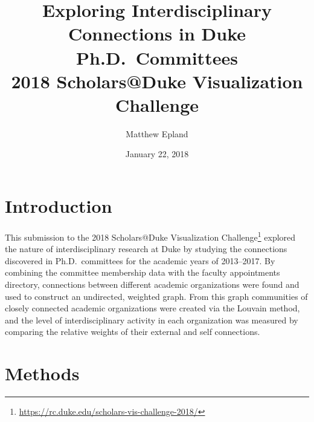 \documentclass[notitlepage,aps,prd,nofootinbib]{revtex4-1}
\begin{document}
\title{Exploring Interdisciplinary Connections in Duke Ph.D.\ Committees\\2018 Scholars@Duke Visualization Challenge}
\author{Matthew\,\,Epland}
\date{January 22, 2018}


\maketitle

\vspace{-1.2cm}

\section{Introduction}
This submission to the 2018 Scholars@Duke Visualization Challenge\footnote{\url{https://rc.duke.edu/scholars-vis-challenge-2018/}} explored the nature of interdisciplinary research at Duke by studying the connections discovered in Ph.D.\ committees for the academic years of 2013--2017. By combining the committee membership data with the faculty appointments directory, connections between different academic organizations were found and used to construct an undirected, weighted graph. From this graph communities of closely connected academic organizations were created via the Louvain method, and the level of interdisciplinary activity in each organization was measured by comparing the relative weights of their external and self connections.


\section{Methods}
\end{document}
